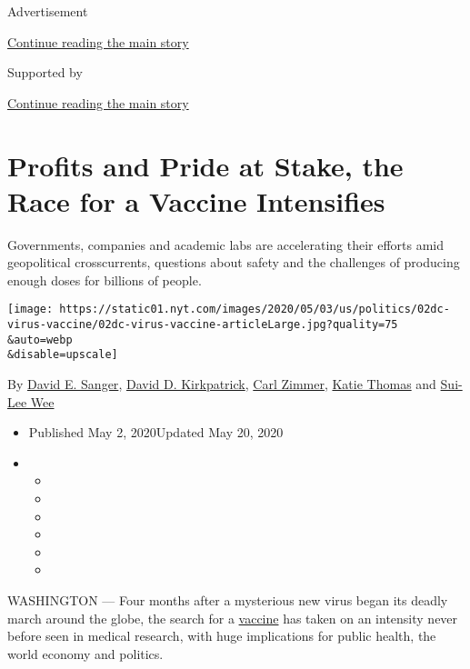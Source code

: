 Advertisement

\protect\hyperlink{after-top}{Continue reading the main story}

Supported by

\protect\hyperlink{after-sponsor}{Continue reading the main story}

\hypertarget{profits-and-pride-at-stake-the-race-for-a-vaccine-intensifies}{%
\section{Profits and Pride at Stake, the Race for a Vaccine
Intensifies}\label{profits-and-pride-at-stake-the-race-for-a-vaccine-intensifies}}

Governments, companies and academic labs are accelerating their efforts
amid geopolitical crosscurrents, questions about safety and the
challenges of producing enough doses for billions of people.

\texttt{[image: https://static01.nyt.com/images/2020/05/03/us/politics/02dc-virus-vaccine/02dc-virus-vaccine-articleLarge.jpg?quality=75\\\&auto=webp\\\&disable=upscale]}

By \href{https://www.nytimes.com/by/david-e-sanger}{David E. Sanger},
\href{https://www.nytimes.com/by/david-d-kirkpatrick}{David D.
Kirkpatrick}, \href{https://www.nytimes.com/by/carl-zimmer}{Carl
Zimmer}, \href{https://www.nytimes.com/by/katie-thomas}{Katie Thomas}
and \href{https://www.nytimes.com/by/sui-lee-wee}{Sui-Lee Wee}

\begin{itemize}
\item
  Published May 2, 2020Updated May 20, 2020
\item
  \begin{itemize}
  \item
  \item
  \item
  \item
  \item
  \item
  \end{itemize}
\end{itemize}

WASHINGTON --- Four months after a mysterious new virus began its deadly
march around the globe, the search for a
\href{https://www.nytimes.com/2020/05/20/health/coronavirus-vaccines.html}{vaccine}
has taken on an intensity never before seen in medical research, with
huge implications for public health, the world economy and politics.

